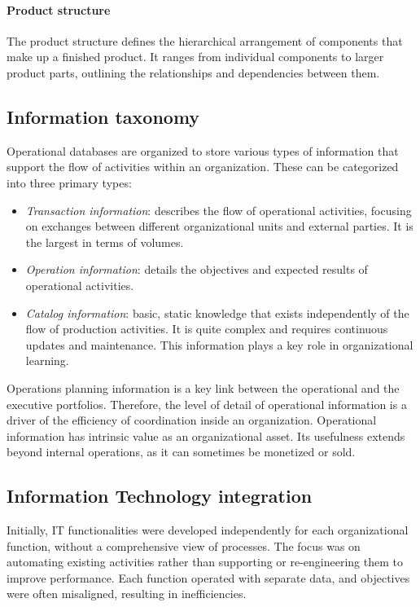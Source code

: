 \paragraph*{Product structure}
The product structure defines the hierarchical arrangement of components that make up a finished product. 
It ranges from individual components to larger product parts, outlining the relationships and dependencies between them.

\subsection{Information taxonomy}
Operational databases are organized to store various types of information that support the flow of activities within an organization. 
These can be categorized into three primary types: 
\begin{itemize}
    \item \textit{Transaction information}: describes the flow of operational activities, focusing on exchanges between different organizational units and external parties.
        It is the largest in terms of volumes. 
    \item \textit{Operation information}: details the objectives and expected results of operational activities. 
    \item \textit{Catalog information}: basic, static knowledge that exists independently of the flow of production activities. 
        It is quite complex and requires continuous updates and maintenance. 
        This information plays a key role in organizational learning.
\end{itemize}
\noindent Operations planning information is a key link between the operational and the executive portfolios.
Therefore, the level of detail of operational information is a driver of the efficiency of coordination inside an organization.
Operational information has intrinsic value as an organizational asset.
Its usefulness extends beyond internal operations, as it can sometimes be monetized or sold. 

\subsection{Information Technology integration}
Initially, IT functionalities were developed independently for each organizational function, without a comprehensive view of processes. 
The focus was on automating existing activities rather than supporting or re-engineering them to improve performance. 
Each function operated with separate data, and objectives were often misaligned, resulting in inefficiencies.

